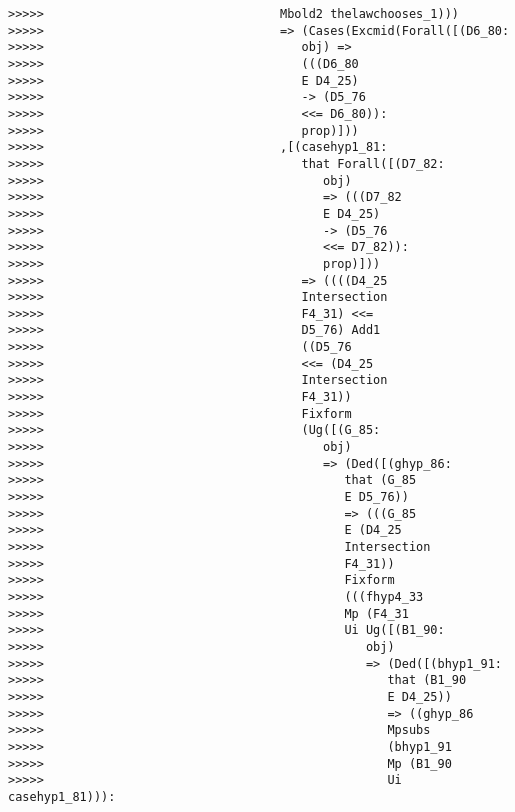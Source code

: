 \documentclass[12pt]{article}
\begin{document}
\begin{verbatim}
>>>>>                                 Mbold2 thelawchooses_1)))
>>>>>                                 => (Cases(Excmid(Forall([(D6_80:
>>>>>                                    obj) =>
>>>>>                                    (((D6_80
>>>>>                                    E D4_25)
>>>>>                                    -> (D5_76
>>>>>                                    <<= D6_80)):
>>>>>                                    prop)]))
>>>>>                                 ,[(casehyp1_81:
>>>>>                                    that Forall([(D7_82:
>>>>>                                       obj)
>>>>>                                       => (((D7_82
>>>>>                                       E D4_25)
>>>>>                                       -> (D5_76
>>>>>                                       <<= D7_82)):
>>>>>                                       prop)]))
>>>>>                                    => ((((D4_25
>>>>>                                    Intersection
>>>>>                                    F4_31) <<=
>>>>>                                    D5_76) Add1
>>>>>                                    ((D5_76
>>>>>                                    <<= (D4_25
>>>>>                                    Intersection
>>>>>                                    F4_31))
>>>>>                                    Fixform
>>>>>                                    (Ug([(G_85:
>>>>>                                       obj)
>>>>>                                       => (Ded([(ghyp_86:
>>>>>                                          that (G_85
>>>>>                                          E D5_76))
>>>>>                                          => (((G_85
>>>>>                                          E (D4_25
>>>>>                                          Intersection
>>>>>                                          F4_31))
>>>>>                                          Fixform
>>>>>                                          (((fhyp4_33
>>>>>                                          Mp (F4_31
>>>>>                                          Ui Ug([(B1_90:
>>>>>                                             obj)
>>>>>                                             => (Ded([(bhyp1_91:
>>>>>                                                that (B1_90
>>>>>                                                E D4_25))
>>>>>                                                => ((ghyp_86
>>>>>                                                Mpsubs
>>>>>                                                (bhyp1_91
>>>>>                                                Mp (B1_90
>>>>>                                                Ui casehyp1_81))):

\end{verbatim}
\end{document}
